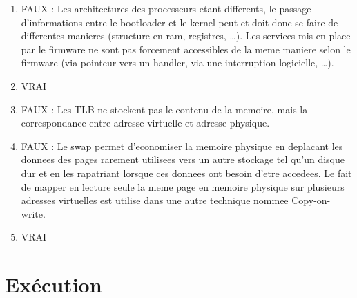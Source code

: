 \begin{correction}

\begin{enumerate}

\item FAUX : Les architectures des processeurs etant differents, le passage d'informations entre le bootloader et le kernel peut et doit donc se faire de differentes manieres (structure en ram, registres, \ldots). Les services mis en place par le firmware ne sont pas forcement accessibles de la meme maniere selon le firmware (via pointeur vers un handler, via une interruption logicielle, \ldots).

\item VRAI

\item FAUX : Les TLB ne stockent pas le contenu de la memoire, mais la correspondance entre adresse virtuelle et adresse physique.

\item FAUX : Le swap permet d'economiser la memoire physique en deplacant les donnees des pages rarement utilisees vers un autre stockage tel qu'un disque dur et en les rapatriant lorsque ces donnees ont besoin d'etre accedees. Le fait de mapper en lecture seule la meme page en memoire physique sur plusieurs adresses virtuelles est utilise dans une autre technique nommee Copy-on-write.

\item VRAI

\end{enumerate}

\end{correction}

%
%

\section{Ex\'ecution
         {\hfill{} }}

